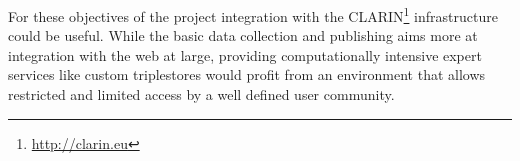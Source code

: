 \documentclass[a4paper,10pt]{article}
\begin{document}
%
%
For these objectives of the project integration with the CLARIN\footnote{\url{http://clarin.eu}}
infrastructure could be useful.
While the basic data collection and publishing aims more at integration with the web at large,
providing computationally intensive expert services like custom triplestores would profit from
an environment that allows restricted and limited access by a well defined user community.



\end{document}
